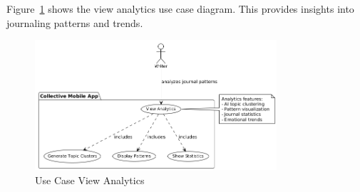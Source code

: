 Figure~\ref{fig:usecase-view-analytics} shows the view analytics use case diagram. This provides insights into journaling patterns and trends.

\begin{figure}[H]
\centering
\includegraphics[width=0.8\textwidth]{files/imgs/usecase_U9ojaijEmp.png}
\caption{Use Case View Analytics}
\label{fig:usecase-view-analytics}
\end{figure}

